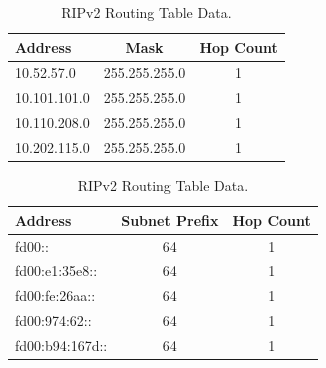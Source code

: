 \documentclass[10pt,a4paper,titlepage]{article}
\begin{document}
            \begin{table}[h!]
                \begin{center}
                \begin{tabular}{|lcc|} \hline
                    Address      & Mask          & Hop Count \\ \hline
                    10.52.57.0   & 255.255.255.0 & 1 \\
                    10.101.101.0 & 255.255.255.0 & 1 \\
                    10.110.208.0 & 255.255.255.0 & 1 \\
                    10.202.115.0 & 255.255.255.0 & 1 \\ \hline
                \end{tabular}
                \caption{RIPv2 Routing Table Data. \label{tab:ripv2routingdata}}
                \end{center}
            \end{table}

            \begin{table}[h!]
                \begin{center}
                \begin{tabular}{|lcc|} \hline
                    Address         & Subnet Prefix & Hop Count \\ \hline
                    fd00::          & 64            & 1 \\
                    fd00:e1:35e8::  & 64            & 1 \\
                    fd00:fe:26aa::  & 64            & 1 \\
                    fd00:974:62::   & 64            & 1 \\ 
                    fd00:b94:167d:: & 64            & 1 \\ \hline
                \end{tabular}
                \caption{RIPv2 Routing Table Data. \label{tab:ripngroutingdata}}
                \end{center}
            \end{table}
    
    \newpage
    \printbibliography
    
    
\end{document}
